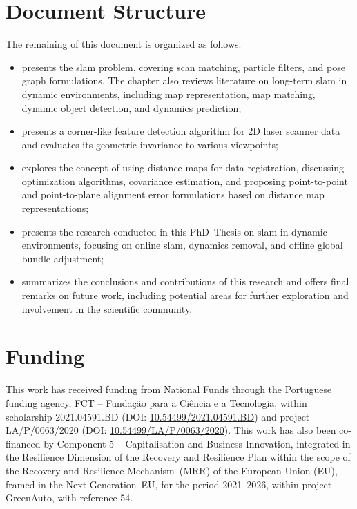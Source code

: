 \section{Document Structure}\label{sec:intro:structure}

The remaining of this document is organized as follows:
\begin{itemize}
\item \textbf{}
presents the \gls{slam} problem, covering scan matching, particle filters,
and pose graph formulations. The chapter also reviews literature on
long-term \gls{slam} in dynamic environments,
including map representation, map matching,
dynamic object detection, and dynamics prediction;
\item \textbf{}
presents a corner-like feature detection algorithm for 2D laser scanner data
and evaluates its geometric invariance to various viewpoints;
\item \textbf{}
explores the concept of using distance maps for data registration,
discussing optimization algorithms, covariance estimation,
and proposing point-to-point and point-to-plane alignment error formulations
based on distance map representations;
\item \textbf{}
presents the research conducted in this PhD~Thesis on
\gls{slam} in dynamic environments,
focusing on online \gls{slam}, dynamics removal, and
offline global bundle adjustment;
\item \textbf{}
summarizes the conclusions and contributions of this research
and offers final remarks on future work,
including potential areas for further exploration
and involvement in the scientific community.
\end{itemize}

\section*{Funding}
This work has received funding from National Funds through the Portuguese
funding agency, FCT -- Fundação para a Ciência e a Tecnologia, within
scholarship 2021.04591.BD
(DOI: \href{https://doi.org/10.54499/2021.04591.BD}{10.54499/2021.04591.BD})
and project LA/P/0063/2020
(DOI: \href{https://doi.org/10.54499/LA/P/0063/2020}{10.54499/LA/P/0063/2020}).
This work has also been co-financed by Component 5 -- Capitalisation
and Business Innovation, integrated in the Resilience Dimension of the Recovery
and Resilience Plan within the scope of the Recovery and Resilience
Mechanism~(MRR) of the European Union (EU), framed in the Next Generation~EU,
for the period 2021--2026, within project GreenAuto, with reference 54.
